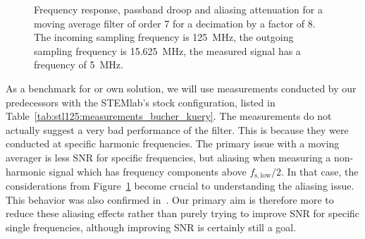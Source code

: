 \begin{figure}
    \centering
    
    \caption[Frequency Response of Moving Averager: Example]{%
        Frequency  response, passband  droop  and aliasing  attenuation for  a
        moving  average  filter  of  order  \num{7}  for  a  decimation  by  a
        factor of \num{8}. The incoming  sampling frequency is \SI{125}{\MHz},
        the  outgoing sampling  frequency is  \SI{15.625}{\MHz}, the  measured
        signal  has   a  frequency   of  \SI{5}{MHz}.%
    }
    \label{fig:stl125:moving_averager}
\end{figure}

As  a benchmark  for  or  own solution,  we  will  use measurements  conducted
by  our  predecessors  with  the  STEMlab's  stock  configuration,  listed  in
Table~\ref{tab:stl125:measurements_bucher_kuery}. The   measurements  do   not
actually  suggest  a very  bad  performance  of  the filter. This  is  because
they   were   conducted   at  specific   harmonic   frequencies. The   primary
issue  with  a   moving  averager  is  less  SNR   for  specific  frequencies,
but  aliasing  when  measuring  a  non-harmonic  signal  which  has  frequency
components above  $f_\mathrm{s,low}/2$. In that case, the  considerations from
Figure~\ref{fig:stl125:moving_averager}  become crucial  to understanding  the
aliasing issue.  This behavior was also confirmed in~\cite{bucher:kuery}.  Our
primary aim  is therefore more  to reduce  these aliasing effects  rather than
purely  trying  to  improve  SNR for  specific  single  frequencies,  although
improving SNR is certainly still a goal.

\begin{table}
    \centering
    \caption{%
        Measurement results  for STEMlab  125-14 from~\cite{bucher:kuery}. SNR
        was  determined for  a  specific harmonic  frequency  signal for  each
        sampling rate.%
    }
    \label{tab:stl125:measurements_bucher_kuery}
\end{table}

